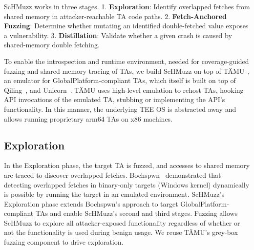 \documentclass[conference]{IEEEtran}
\newcommand{\sysname}{ScHMuzz\xspace}
\newcommand{\stageone}{Exploration\xspace}
\newcommand{\stagetwo}{Fetch-Anchored Fuzzing\xspace}
\newcommand{\stagethree}{Distillation\xspace}
\begin{document}
\sysname works in three stages.
1. \textbf{\stageone}: Identify overlapped fetches from shared memory in attacker-reachable TA 
code paths. 2. \textbf{\stagetwo}: Determine whether mutating an identified 
double-fetched value exposes a vulnerability. 3. \textbf{\stagethree}: Validate whether 
a given crash is caused by shared-memory double fetching. 


To enable the introspection and runtime environment, needed for coverage-guided fuzzing 
and shared memory tracing of TAs, we build \sysname on top of TÄMU~\cite{taemu}, an emulator 
for GlobalPlatform-compliant TAs, which itself is built on 
top of Qiling~\cite{qiling}, and Unicorn~\cite{unicorn}.
TÄMU uses high-level emulation to rehost TAs, hooking API invocations of the emulated TA, 
stubbing or implementing the API's functionality. In this manner, the underlying TEE OS is 
abstracted away and allows running proprietary arm64 TAs on x86 machines.

\subsection{\stageone}

In the \stageone phase, the target TA is fuzzed, and accesses to shared memory are traced to 
discover overlapped fetches. Bochspwn~\cite{bochspwn} 
demonstrated that detecting overlapped fetches in binary-only targets (Windows kernel) dynamically 
is possible by running the target in an emulated environment. 
\sysname's \stageone phase extends Bochspwn's approach to target GlobalPlatform-compliant TAs 
and enable \sysname's second and third stages.
Fuzzing allows \sysname 
to explore all attacker-exposed functionality regardless of whether or not the functionality is 
used during benign usage. We reuse TÄMU's grey-box fuzzing component to drive exploration.
\end{document}
